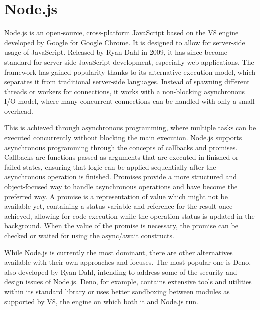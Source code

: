 \section{Node.js}
Node.js is an open-source, cross-platform JavaScript based on the V8 engine developed by Google for Google Chrome. It is designed to allow for server-side usage of JavaScript. Released by Ryan Dahl in 2009, it has since become standard for server-side JavaScript development, especially web applications. The framework has gained popularity thanks to its alternative execution model, which separates it from traditional server-side languages. Instead of spawning different threads or workers for connections, it works with a non-blocking asynchronous I/O model, where many concurrent connections can be handled with only a small overhead.\par
This is achieved through asynchronous programming, where multiple tasks can be executed concurrently without blocking the main execution. Node.js supports asynchronous programming through the concepts of callbacks and promises. Callbacks are functions passed as arguments that are executed in finished or failed states, ensuring that logic can be applied sequentially after the asynchronous operation is finished. Promises provide a more structured and object-focused way to handle asynchronous operations and have become the preferred way. A promise is a representation of value which might not be available yet, containing a status variable and reference for the result once achieved, allowing for code execution while the operation status is updated in the background. When the value of the promise is necessary, the promise can be checked or waited for using the async/await constructs.\par
While Node.js is currently the most dominant, there are other alternatives available with their own approaches and focuses. The most popular one is Deno, also developed by Ryan Dahl, intending to address some of the security and design issues of Node.js. Deno, for example, contains extensive tools and utilities within its standard library or uses better sandboxing between modules as supported by V8, the engine on which both it and Node.js run.\par

